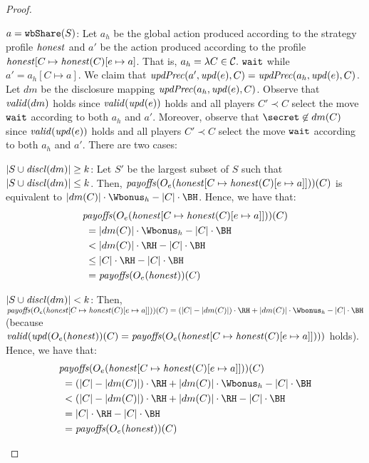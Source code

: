 \begin{proof}
\begin{compactitem}
\begin{compactitem}
\item[$a = \wShare{S}$:]
%
Let $a_h$ be the global action produced according to the strategy profile $\honest$ and $a'$ be the action produced according to the profile $\honest[C \mapsto \honest(C)[e \mapsto a]$.
%
That is, $a_h = \lambda C \in \coalitionSchema.\ \wait$ while $a'= a_h[C \mapsto a]$.
%
We claim that  $ \updPrec{a'}{\update{e}}{C} =  \updPrec{a_h}{\update{e}}{C}$.
%
Let $dm$ be the disclosure mapping $\updPrec{a_h}{\update{e}}{C}$.
%
Observe that $\valid{dm}$ holds since $\valid{\update{e}}$ holds and all players $C' \prec C$ select the move $\wait$ according to both $a_h$ and $a'$.
%
Moreover, observe that $\secret \not\in dm(C)$ since $\valid{\update{e}}$ holds and all players $C' \prec C$ select the move $\wait$ according to both $a_h$ and $a'$.
%
There are two cases:
\begin{compactitem}
\item[$|S \cup \disclosed{dm}| \geq k$:]
%
Let $S'$ be the largest subset of $S$ such that $|S \cup \disclosed{dm}| \leq k$.
%
Then, $\payoffs(\subgameOutcome{\honest[C \mapsto \honest(C)[e \mapsto a]]}{e})(C)$ is equivalent to  $|dm(C)| \cdot \Wbonus_h - |C| \cdot \BH$.
%
Hence, we have that:
%
	\begin{align*}
			&\payoffs(\subgameOutcome{\honest[C \mapsto \honest(C)[e \mapsto a]]}{e})(C) \\
			&\ = |dm(C)| \cdot \Wbonus_h - |C| \cdot \BH \\  
			&\ < |dm(C)| \cdot \RH - |C| \cdot \BH \\	%
			&\ \leq |C| \cdot \RH - |C| \cdot \BH \\	%
			&\ = \payoffs(\subgameOutcome{\honest}{e})(C) %
	\end{align*}
%
\item[$|S \cup \disclosed{dm}| < k$:] 
%
Then, $\payoffs(\subgameOutcome{\honest[C \mapsto \honest(C)[e \mapsto a]]}{e})(C) = (|C| - |dm(C)|) \cdot \RH + |dm(C)| \cdot \Wbonus_h - |C| \cdot \BH$ (because $\valid{\update{\subgameOutcome{\honest}{e})(C) = \payoffs(\subgameOutcome{\honest[C \mapsto \honest(C)[e \mapsto a]]}{e}}}$ holds).
%
Hence, we have that:
	\begin{align*}
			&\payoffs(\subgameOutcome{\honest[C \mapsto \honest(C)[e \mapsto a]]}{e})(C) \\
			&\ = (|C| - |dm(C)|) \cdot \RH + |dm(C)| \cdot \Wbonus_h - |C| \cdot \BH \\  
			&\ < (|C| - |dm(C)|) \cdot \RH + |dm(C)| \cdot \RH - |C| \cdot \BH \\	%
			&\ = |C|  \cdot \RH - |C| \cdot \BH \\ 
			&\ = \payoffs(\subgameOutcome{\honest}{e})(C) %
	\end{align*}



\end{compactitem}
\end{compactitem}
\end{compactitem}
\end{proof}
